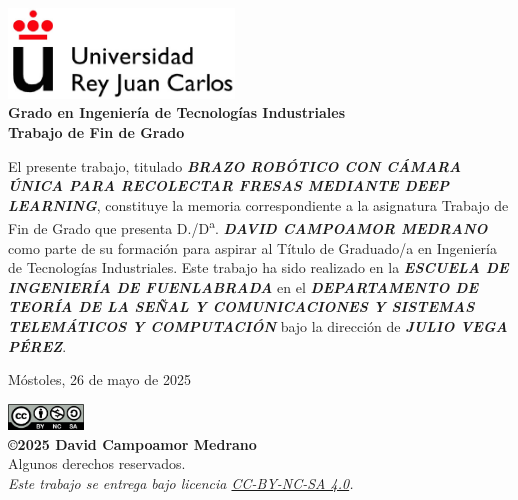

\thispagestyle{empty}
\begin{center}
    \includegraphics[width=0.45\textwidth]{figs/logo_urjc.jpg}\\[1cm]

    {\large{\textbf{Grado en Ingeniería de Tecnologías Industriales}}}\\[1cm]
    {\large{\textbf{Trabajo de Fin de Grado}}}\\[1cm]
\end{center}


El presente trabajo, titulado \textit{\textbf{BRAZO ROBÓTICO CON CÁMARA ÚNICA PARA RECOLECTAR FRESAS MEDIANTE DEEP LEARNING}}, constituye la memoria correspondiente a la asignatura Trabajo de Fin de Grado que presenta D./D\textsuperscript{a}. \textit{\textbf{DAVID CAMPOAMOR MEDRANO}} como parte de su formación para aspirar al Título de Graduado/a en Ingeniería de Tecnologías Industriales. Este trabajo ha sido realizado en la \textit{\textbf{ESCUELA DE INGENIERÍA DE FUENLABRADA}} en el \textit{\textbf{DEPARTAMENTO DE TEORÍA DE LA SEÑAL Y COMUNICACIONES Y SISTEMAS TELEMÁTICOS Y COMPUTACIÓN}} bajo la dirección de \textit{\textbf{JULIO VEGA PÉREZ}}.\\[3cm]

\begin{flushright}
Móstoles, 26 de mayo de 2025
\end{flushright}

\vspace{2cm}

\begin{flushright}
{\small
\includegraphics[width=0.15\textwidth]{figs/by-nc-sa.png}\\
\textbf{\copyright 2025 David Campoamor Medrano}\\
Algunos derechos reservados.\\
\emph{
Este trabajo se entrega bajo licencia \href{https://creativecommons.org/licenses/by-nc-sa/4.0}{CC-BY-NC-SA 4.0}.\\
}}
\end{flushright}


